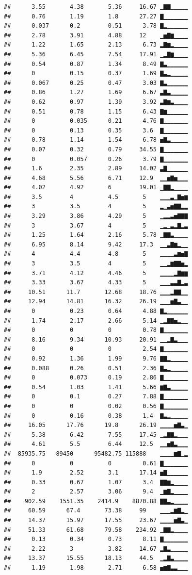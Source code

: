 \documentclass[]{apa6}
\theoremstyle{definition}
\theoremstyle{definition}
\theoremstyle{definition}
\theoremstyle{remark}
\begin{document}
\begin{verbatim}
##      3.55       4.38       5.36     16.67 ▁▇▇▁▁▁▁▁
##      0.76       1.19       1.8      27.27 ▇▁▁▁▁▁▁▁
##      0.037      0.2        0.51      3.78 ▇▂▁▁▁▁▁▁
##      2.78       3.91       4.88     12    ▁▅▇▆▁▁▁▁
##      1.22       1.65       2.13      6.73 ▂▇▆▂▁▁▁▁
##      5.36       6.45       7.54     17.91 ▁▂▇▆▁▁▁▁
##      0.54       0.87       1.34      8.49 ▇▃▁▁▁▁▁▁
##      0          0.15       0.37      1.69 ▇▃▂▁▁▁▁▁
##      0.067      0.25       0.47      3.03 ▇▃▁▁▁▁▁▁
##      0.86       1.27       1.69      6.67 ▃▇▃▁▁▁▁▁
##      0.62       0.97       1.39      3.92 ▃▇▆▃▁▁▁▁
##      0.51       0.78       1.15      6.43 ▇▆▁▁▁▁▁▁
##      0          0.035      0.21      4.76 ▇▁▁▁▁▁▁▁
##      0          0.13       0.35      3.6  ▇▁▁▁▁▁▁▁
##      0.78       1.14       1.54      6.78 ▅▇▃▁▁▁▁▁
##      0.07       0.32       0.79     34.55 ▇▁▁▁▁▁▁▁
##      0          0.057      0.26      3.79 ▇▁▁▁▁▁▁▁
##      1.6        2.35       2.89     14.02 ▃▇▁▁▁▁▁▁
##      4.68       5.56       6.71     12.9  ▁▁▅▇▅▁▁▁
##      4.02       4.92       6        19.01 ▁▇▇▂▁▁▁▁
##      3.5        4          4.5       5    ▁▁▁▃▁▇▅▆
##      3          3.5        4         5    ▂▁▃▅▇▇▂▂
##      3.29       3.86       4.29      5    ▁▂▂▃▅▇▇▇
##      3          3.67       4         5    ▁▂▁▃▂▇▂▃
##      1.25       1.64       2.16      5.78 ▁▇▇▃▁▁▁▁
##      6.95       8.14       9.42     17.3  ▁▁▃▇▆▂▁▁
##      4          4.4        4.8       5    ▁▁▁▁▃▆▅▇
##      3          3.5        4         5    ▁▁▂▆▇▇▅▂
##      3.71       4.12       4.46      5    ▁▁▁▁▂▇▆▆
##      3.33       3.67       4.33      5    ▁▁▁▃▃▇▂▃
##     10.51      11.7       12.68     18.76 ▁▁▁▂▇▇▁▁
##     12.94      14.81      16.32     26.19 ▁▁▁▅▇▃▁▁
##      0          0.23       0.64      4.88 ▇▂▁▁▁▁▁▁
##      1.74       2.17       2.66      5.14 ▁▂▇▇▅▂▁▁
##      0          0          0         0.78 ▇▁▁▁▁▁▁▁
##      8.16       9.34      10.93     20.91 ▁▁▂▇▃▁▁▁
##      0          0          0         2.54 ▇▁▁▁▁▁▁▁
##      0.92       1.36       1.99      9.76 ▇▇▂▁▁▁▁▁
##      0.088      0.26       0.51      2.36 ▇▃▂▁▁▁▁▁
##      0          0.073      0.19      2.86 ▇▁▁▁▁▁▁▁
##      0.54       1.03       1.41      5.66 ▆▇▃▁▁▁▁▁
##      0          0.1        0.27      7.88 ▇▁▁▁▁▁▁▁
##      0          0          0.02      0.56 ▇▁▁▁▁▁▁▁
##      0          0.16       0.38      1.4  ▇▃▂▁▁▁▁▁
##     16.05      17.76      19.8      26.19 ▁▁▁▁▅▇▃▁
##      5.38       6.42       7.55     17.45 ▁▂▇▇▂▁▁▁
##      4.61       5.5        6.44     12.5  ▁▁▅▇▃▁▁▁
##  85935.75   89450      95482.75 115888    ▁▁▁▁▆▇▁▂
##      0          0          0         0.61 ▇▁▁▁▁▁▁▁
##      1.9        2.52       3.1      17.14 ▅▇▁▁▁▁▁▁
##      0.33       0.67       1.07      3.4  ▇▇▆▂▁▁▁▁
##      2          2.57       3.06      9.4  ▁▆▇▂▁▁▁▁
##    902.59    1551.35    2414.9    8870.88 ▇▇▃▂▁▁▁▁
##     60.59      67.4       73.38     99    ▁▁▁▂▆▇▂▁
##     14.37      15.97      17.55     23.67 ▁▁▁▁▅▇▃▁
##     51.33      61.68      79.58    234.92 ▁▇▇▂▁▁▁▁
##      0.13       0.34       0.73      8.11 ▇▁▁▁▁▁▁▁
##      2.22       3          3.82     14.67 ▂▇▃▁▁▁▁▁
##     13.37      15.55      18.13     44.5  ▁▂▇▃▁▁▁▁
##      1.19       1.98       2.71      6.58 ▅▆▇▃▃▁▁▁
\end{verbatim}
\end{document}
